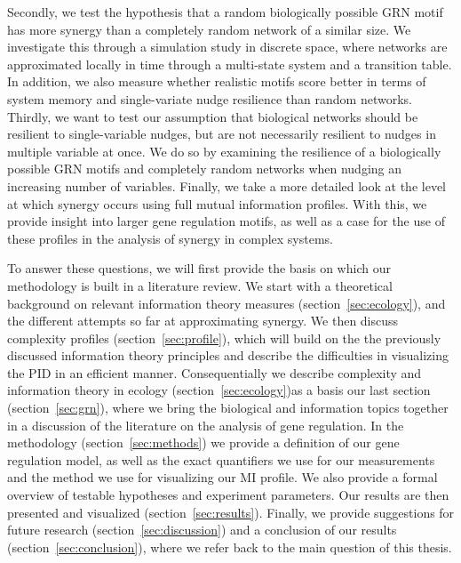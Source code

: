 \documentclass[../main.tex]{subfiles}
\begin{document}
Secondly, we test the hypothesis that a random biologically possible GRN motif has more synergy than a completely random network of a similar size. 
We investigate this through a simulation study in discrete space, where networks are approximated locally in time through a multi-state system and a transition table.
In addition, we also measure whether realistic motifs score better in terms of system memory and single-variate nudge resilience than random networks. %
Thirdly, we want to test our assumption that biological networks should be resilient to single-variable nudges, but are not necessarily resilient to nudges in multiple variable at once.
We do so by examining the resilience of a biologically possible GRN motifs and completely random networks when nudging an increasing number of variables.
Finally, we take a more detailed look at the level at which synergy occurs using full mutual information profiles.
With this, we provide insight into larger gene regulation motifs, as well as a case for the use of these profiles in the analysis of synergy in complex systems.

To answer these questions, we will first provide the basis on which our methodology is built in a literature review.
We start with a theoretical background on relevant information theory measures (section~\ref{sec:ecology}), and the different attempts so far at approximating synergy.
We then discuss complexity profiles (section~\ref{sec:profile}), which will build on the the previously discussed information theory principles and describe the difficulties in visualizing the PID in an efficient manner.
Consequentially we describe complexity and information theory in ecology (section~\ref{sec:ecology})as a basis our last section (section~\ref{sec:grn}), where we bring the biological and information topics together in a discussion of the literature on the analysis of gene regulation.
In the methodology (section~\ref{sec:methods}) we provide a definition of our gene regulation model, as well as the exact quantifiers we use for our measurements and the method we use for visualizing our MI profile.
We also provide a formal overview of testable hypotheses and experiment parameters.
Our results are then presented and visualized (section~\ref{sec:results}).
Finally, we provide suggestions for future research (section~\ref{sec:discussion}) and a conclusion of our results (section~\ref{sec:conclusion}), where we refer back to the main question of this thesis.
\end{document}
